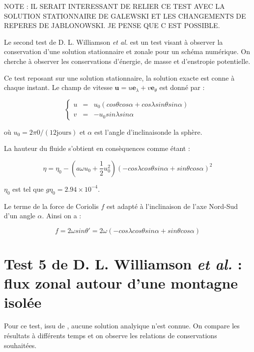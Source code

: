 NOTE : IL SERAIT INTERESSANT DE RELIER CE TEST AVEC LA SOLUTION STATIONNAIRE DE GALEWSKI ET LES CHANGEMENTS DE REPERES DE JABLONOWSKI. JE PENSE QUE C EST POSSIBLE.

Le second test de D. L. Williamson \textit{et al.} \cite{Williamson1992} est un test visant à observer la conservation d'une solution stationnaire et zonale pour un schéma numérique. On cherche à observer les conservations d'énergie, de masse et d'enstropie potentielle.

Ce test reposant sur une solution stationnaire, la solution exacte est conne à chaque instant. Le champ de vitesse $\mathbf{u} = u \mathbf{e}_{\lambda} + v \mathbf{e}_{\theta}$ est donné par :

\begin{equation}
\left\lbrace
\begin{array}{rcl}
u & = & u_0 \left( cos \theta cos \alpha + cos \lambda sin \theta sin \alpha \right)\\
v & = & - u_0 sin \lambda sin \alpha
\end{array}
\right.
\label{eq:williamson2_u}
\end{equation}

où $u_0 = 2 \pi 0 / (12 \text{jours} )$ et $\alpha$ est l'angle d'inclinaisonde  la sphère.

La hauteur du fluide s'obtient en consèquences comme étant :

\begin{equation}
\eta = \eta_0 - \left( a \omega u_0 + \dfrac{1}{2}u_0^2 \right) \left( -cos \lambda cos \theta sin \alpha + sin \theta cos \alpha \right)^2
\label{eq:williamson2_h}
\end{equation}

$\eta_0$ est tel que $g \eta_0 = 2.94 \times 10^{-4}$. 

Le terme de la force de Coriolis $f$ est adapté à l'inclinaison de l'axe Nord-Sud d'un angle $\alpha$. Ainsi on a :

$$ f = 2 \omega sin \theta' = 2 \omega \left( -cos \lambda cos \theta sin \alpha + sin \theta cos \alpha \right)$$





\section{Test 5 de D. L. Williamson \textit{et al.} : flux zonal autour d'une montagne isolée}

Pour ce test, issu de \cite{Williamson1992}, aucune solution analyique n'est connue. On compare les résultats à différents temps et on observe les relations de conservations souhaitées.

